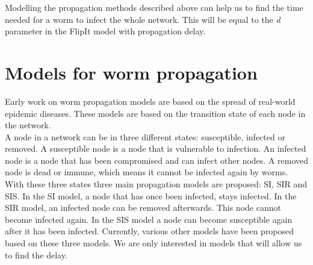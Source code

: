 \begin{description}
\end{description}

 Modelling the propagation methods described above can help us to find the time needed for a worm to infect the whole network. This will be equal to the \textit{d} parameter in the FlipIt model with propagation delay. \\

\section{Models for worm propagation}
\label{modelsforpropagation}
Early work on worm propagation models are based on the spread of real-world epidemic diseases. These models are based on the transition state of each node in the network.\\
A node in a network can be in three different states: susceptible, infected or removed. A susceptible node is a node that is vulnerable to infection. An infected node is a node that has been compromised and can infect other nodes. A removed node is dead or immune, which means it cannot be infected again by worms. With these three states three main propagation models are proposed: SI, SIR and SIS. In the SI model, a node that has once been infected, stays infected. In the SIR model, an infected node can be removed afterwards. This node cannot become infected again. In the SIS model a node can become susceptible again after it has been infected. Currently, various other models have been proposed based on these three models.  We are only interested in models that will allow us to find the delay. \\

